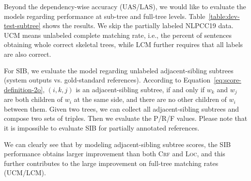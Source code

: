 

Beyond the dependency-wise accuracy (UAS/LAS), we
would like to evaluate the models regarding performance at sub-tree and full-tree levels.
Table~\ref{table:dev-test-subtree} shows the results. We skip the partially labeled NLPCC19 data.
UCM means unlabeled complete matching rate, i.e., the percent of sentences obtaining whole correct skeletal trees, while
LCM further requires that all labels are also correct.


For SIB, we evaluate the model regarding unlabeled adjacent-sibling subtrees %
(system outputs vs. gold-standard references). %
According to Equation~\ref{eq:score-definition-2o},
$(i,k,j)$ is an adjacent-sibling subtree, if and only if $w_k$ and $w_j$ are both children of $w_i$ at the same side, and there are no other children of $w_i$ between them.
Given two trees, we can collect all adjacent-sibling subtrees and compose two sets of triples.
Then we evaluate the P/R/F values.
Please note that it is impossible to evaluate SIB for partially annotated references.

We can clearly see that by modeling adjacent-sibling subtree scores,
the SIB performance obtains larger improvement than both \textsc{Crf} and \textsc{Loc},
and this further contributes to the large improvement on full-tree matching rates (UCM/LCM).



